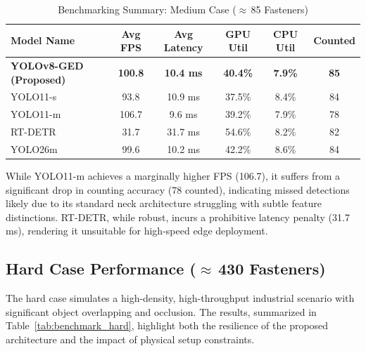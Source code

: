 \begin{table}[htbp]
    \centering
    \caption{Benchmarking Summary: Medium Case ($\approx$\,85 Fasteners)}
    \label{tab:benchmark_medium}
    \begin{tabular}{lccccc}
        \toprule
        \textbf{Model Name} & \textbf{Avg FPS} & \textbf{Avg Latency} & \textbf{GPU Util} & \textbf{CPU Util} & \textbf{Counted} \\
        \midrule
        \textbf{YOLOv8-GED (Proposed)} & \textbf{100.8} & \textbf{10.4 ms} & \textbf{40.4\%} & \textbf{7.9\%} & \textbf{85} \\
        YOLO11-s             & 93.8           & 10.9 ms            & 37.5\%          & 8.4\%           & 84             \\
        YOLO11-m             & 106.7          & 9.6 ms             & 39.2\%          & 7.9\%           & 78             \\
        RT-DETR              & 31.7           & 31.7 ms            & 54.6\%          & 8.2\%           & 82             \\
        YOLO26m              & 99.6           & 10.2 ms            & 42.2\%          & 8.6\%           & 84             \\
        \bottomrule
    \end{tabular}
\end{table}

While YOLO11-m achieves a marginally higher FPS (106.7), it suffers from a significant drop in counting accuracy (78 counted), indicating missed detections likely due to its standard neck architecture struggling with subtle feature distinctions. RT-DETR, while robust, incurs a prohibitive latency penalty (31.7\,ms), rendering it unsuitable for high-speed edge deployment.

\subsection{Hard Case Performance ($\approx$\,430 Fasteners)}
The hard case simulates a high-density, high-throughput industrial scenario with significant object overlapping and occlusion. The results, summarized in Table~\ref{tab:benchmark_hard}, highlight both the resilience of the proposed architecture and the impact of physical setup constraints.


